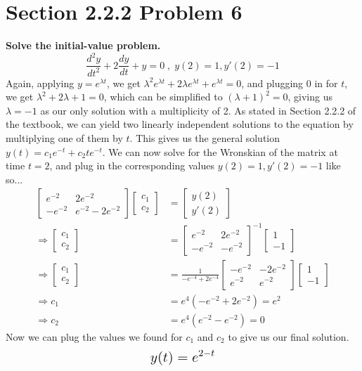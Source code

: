 \documentclass[11pt]{article}
\renewcommand{\l}{\lambda}
\begin{document}
 \section*{Section 2.2.2 Problem 6}
 \textbf{Solve the initial-value problem.}
 $$\frac{d^2y}{dt^2} + 2\frac{dy}{dt} + y = 0 \;,\; y(2) = 1, y'(2) = -1$$
 Again, applying $y = e^{\l t}$, we get $\l^2 e^{\l t} + 2\l e^{\l t} + e^{\l t} = 0$, and plugging 
 0 in for $t$, we get $\l^2 + 2\l + 1 = 0$, which can be simplified to $(\l + 1)^2 = 0$, giving us 
 $\l = -1$ as our only solution with a multiplicity of 2.  As stated in Section 2.2.2 of the textbook, 
 we can yield two linearly independent solutions to the equation by multiplying one of them by $t$.  
 This gives us the general solution $y(t) = c_1e^{-t} + c_2te^{-t}$.  We can now solve for the Wronskian 
 of the matrix at time $t=2$, and plug in the corresponding values $y(2)=1,y'(2)=-1$ like so...
\begin{align*}
&& \begin{bmatrix} e^{-2} & 2e^{-2} \\ -e^{-2} & e^{-2} - 2e^{-2} \end{bmatrix}
\begin{bmatrix} c_1 \\ c_2 \end{bmatrix} &= \begin{bmatrix} y(2) \\ y'(2) \end{bmatrix} && \\
&& \Rightarrow \begin{bmatrix} c_1 \\ c_2 \end{bmatrix} &=
\begin{bmatrix} e^{-2} & 2e^{-2} \\ -e^{-2} & -e^{-2} \end{bmatrix} ^{-1}
  \begin{bmatrix} 1 \\ -1 \end{bmatrix} && \\
    && \Rightarrow \begin{bmatrix} c_1 \\ c_2 \end{bmatrix} &= \frac{1}{-e^{-4} + 2e^{-4}}
\begin{bmatrix} -e^{-2} & -2e^{-2} \\ e^{-2} & e^{-2} \end{bmatrix}
\begin{bmatrix} 1 \\ -1 \end{bmatrix} && \\
  && \Rightarrow c_1 &= e^4(-e^{-2}+2e^{-2}) = e^2 && \\
  && \Rightarrow c_2 &= e^4(e^{-2}-e^{-2}) = 0 &&
\end{align*}
Now we can plug the values we found for $c_1$ and $c_2$ to give us our final solution.
$$\mathlarger{\mathlarger{y(t) = e^{2-t}}}$$
 \newpage
\end{document}
